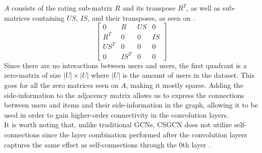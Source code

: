 $A$ consists of the rating sub-matrix $R$ and its transpose $R^T$, as well as sub-matrices containing $US$, $IS$, and their transposes, as seen on .
\begin{equation}\label{csgcn_is_adj_mat}
    \begin{bmatrix}
    0 & R & US & 0\\
    R^T & 0 & 0 & IS\\
    US^T & 0 & 0 & 0 \\
    0 & IS^T & 0 & 0
    \end{bmatrix}
\end{equation}
Since there are no interactions between users and users, the first quadrant is a zero-matrix of size $|U|\times|U|$ where $|U|$ is the amount of users in the dataset.
This goes for all the zero matrices seen on $A$, making it mostly sparse.
Adding the side-information to the adjacency matrix allows us to express the connections between users and items and their side-information in the graph, allowing it to be used in order to gain higher-order connectivity in the convolution layers.\\
It is worth noting that, unlike traditional GCNs, CSGCN does not utilize self-connections since the layer combination performed after the convolution layers captures the same effect as self-connections through the 0th layer \cite{LightGCN}.

